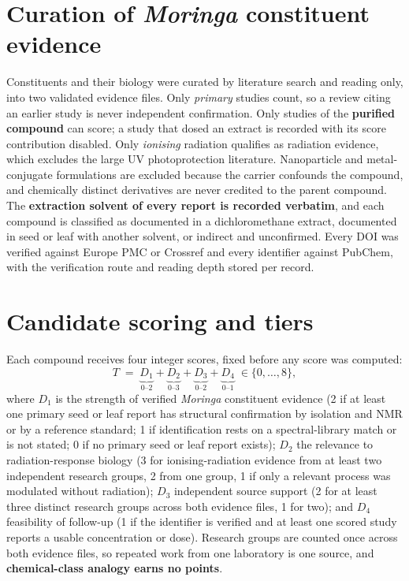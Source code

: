 \section{Curation of \textit{Moringa} constituent evidence}\label{sec:curation-methods}

Constituents and their biology were curated by literature search and reading only, into two
validated evidence files. Only \emph{primary} studies count, so a review citing an earlier
study is never independent confirmation. Only studies of the \textbf{purified compound} can
score; a study that dosed an extract is recorded with its score contribution disabled. Only
\emph{ionising} radiation qualifies as radiation evidence, which excludes the large UV
photoprotection literature. Nanoparticle and metal-conjugate formulations are excluded
because the carrier confounds the compound, and chemically distinct derivatives are never
credited to the parent compound. The \textbf{extraction solvent of every report is recorded
verbatim}, and each compound is classified as documented in a dichloromethane extract,
documented in seed or leaf with another solvent, or indirect and unconfirmed. Every DOI was
verified against Europe PMC or Crossref and every identifier against PubChem, with the
verification route and reading depth stored per record.

\section{Candidate scoring and tiers}\label{sec:scoring}

Each compound receives four integer scores, fixed before any score was computed:
\begin{equation}
  T \;=\; \underbrace{D_1}_{0\text{--}2}+\underbrace{D_2}_{0\text{--}3}
         +\underbrace{D_3}_{0\text{--}2}+\underbrace{D_4}_{0\text{--}1}\;\in\{0,\dots,8\},
  \label{eq:priority}
\end{equation}
where $D_1$ is the strength of verified \textit{Moringa} constituent evidence (2 if at least
one primary seed or leaf report has structural confirmation by isolation and NMR or by a
reference standard; 1 if identification rests on a spectral-library match or is not stated;
0 if no primary seed or leaf report exists); $D_2$ the relevance to radiation-response
biology (3 for ionising-radiation evidence from at least two independent research groups,
2 from one group, 1 if only a relevant process was modulated without radiation); $D_3$
independent source support (2 for at least three distinct research groups across both
evidence files, 1 for two); and $D_4$ feasibility of follow-up (1 if the identifier is
verified and at least one scored study reports a usable concentration or dose). Research
groups are counted once across both evidence files, so repeated work from one laboratory is
one source, and \textbf{chemical-class analogy earns no points}.


